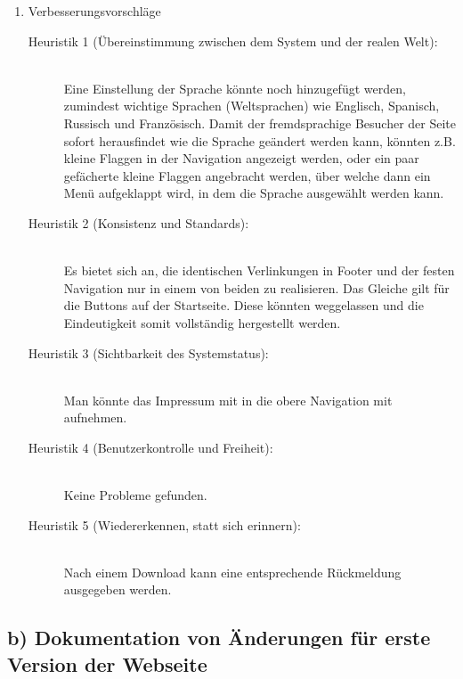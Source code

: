 \documentclass{scrartcl}
\begin{document}
\begin{enumerate}
\item Verbesserungsvorschläge
\begin{description}
\item[Heuristik 1 (Übereinstimmung zwischen dem System und der realen Welt):] \ \\
Eine Einstellung der Sprache könnte noch hinzugefügt werden, zumindest wichtige Sprachen (Weltsprachen) wie Englisch, Spanisch, Russisch und Französisch. Damit der fremdsprachige Besucher der Seite sofort herausfindet wie die Sprache geändert werden kann, könnten z.B. kleine
Flaggen in der Navigation angezeigt werden, oder ein paar gefächerte kleine Flaggen angebracht werden, über welche dann ein Menü aufgeklappt wird, in dem die Sprache ausgewählt werden kann.
\item[Heuristik 2 (Konsistenz und Standards):] \ \\
Es bietet sich an, die identischen Verlinkungen in Footer und der festen Navigation nur in einem von beiden zu realisieren. Das Gleiche gilt für die Buttons auf der Startseite. Diese könnten weggelassen und die Eindeutigkeit somit vollständig hergestellt werden.
\item[Heuristik 3 (Sichtbarkeit des Systemstatus):] \ \\
Man könnte das Impressum mit in die obere Navigation mit aufnehmen.
\item[Heuristik 4 (Benutzerkontrolle und Freiheit):] \ \\
Keine Probleme gefunden.
\item[Heuristik 5 (Wiedererkennen, statt sich erinnern):] \ \\
Nach einem Download kann eine entsprechende Rückmeldung ausgegeben werden. 
\end{description}
\end{enumerate}
\subsection*{b) Dokumentation von Änderungen für erste Version der Webseite}
\end{document}
